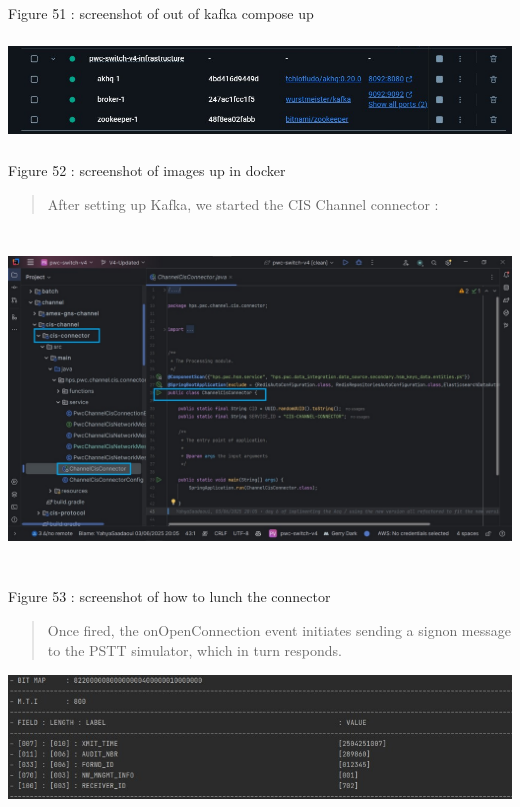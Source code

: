 \documentclass[12pt,a4paper]{report}
\begin{document}
\protect\hypertarget{_Toc201954527}{}{}Figure 51 : screenshot of out of
kafka compose up

\includegraphics[width=6.22934in,height=1.09292in]{vertopal_d1b0b2209edd4c6aa8254f57daa0953b/media/image71.jpeg}

\protect\hypertarget{_Toc201954528}{}{}Figure 52 : screenshot of images
up in docker

\begin{quote}
After setting up Kafka, we started the CIS Channel connector :
\end{quote}

\includegraphics[width=6.30278in,height=3.54722in]{vertopal_d1b0b2209edd4c6aa8254f57daa0953b/media/image72.jpeg}

\protect\hypertarget{_Toc201954529}{}{}Figure 53 : screenshot of how to
lunch the connector

\begin{quote}
Once fired, the onOpenConnection event initiates sending a signon
message to the PSTT simulator, which in turn responds.
\end{quote}

\includegraphics[width=5.3526in,height=1.31591in]{vertopal_d1b0b2209edd4c6aa8254f57daa0953b/media/image73.jpeg}
\end{document}
